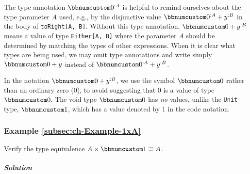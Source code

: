 The type annotation $\bbnum 0^{:A}$ is helpful to remind ourselves
about the type parameter $A$ used, e.g., by the disjunctive value
$\bbnum 0^{:A}+y^{:B}$ in the body of \lstinline!toRight[A, B]!.
Without this type annotation, $\bbnum 0+y^{:B}$ means a value of
type \lstinline!Either[A, B]! where the parameter $A$ should be
determined by matching the types of other expressions. When it is
clear what types are being used, we may omit type annotations and
write simply $\bbnum 0+y$ instead of $\bbnum 0^{:A}+y^{:B}$.

In the notation $\bbnum 0+y^{:B}$, we use the symbol $\bbnum 0$
rather than an ordinary zero ($0$), to avoid suggesting that $0$
is a value of type $\bbnum 0$. The void type $\bbnum 0$ has \emph{no}
values, unlike the \lstinline!Unit! type, $\bbnum 1$, which has
a value denoted by $1$ in the code notation.

\subsubsection{Example \label{subsec:ch-Example-1xA}\ref{subsec:ch-Example-1xA}}

Verify the type equivalence $A\times\bbnum 1\cong A$.

\subparagraph{Solution}


